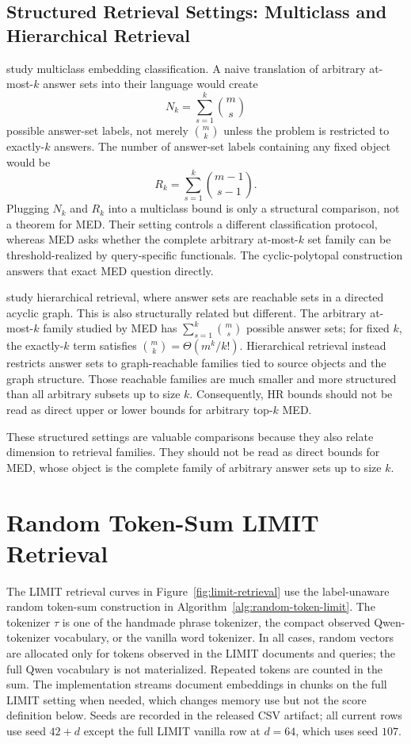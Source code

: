 \documentclass{article}
\begin{document}
\subsection{Structured Retrieval Settings: Multiclass and Hierarchical Retrieval}

\citet{guo2019breaking} study multiclass embedding classification. A naive translation of arbitrary at-most-$k$ answer sets into their language would create
\[
    N_k=\sum_{s=1}^{k}\binom{m}{s}
\]
possible answer-set labels, not merely $\binom{m}{k}$ unless the problem is restricted to exactly-$k$ answers. The number of answer-set labels containing any fixed object would be
\[
    R_k=\sum_{s=1}^{k}\binom{m-1}{s-1}.
\]
Plugging $N_k$ and $R_k$ into a multiclass bound is only a structural comparison, not a theorem for MED. Their setting controls a different classification protocol, whereas MED asks whether the complete arbitrary at-most-$k$ set family can be threshold-realized by query-specific functionals. The cyclic-polytopal construction answers that exact MED question directly.

\citet{you2025hierarchical} study hierarchical retrieval, where answer sets are reachable sets in a directed acyclic graph. This is also structurally related but different. The arbitrary at-most-$k$ family studied by MED has $\sum_{s=1}^{k}\binom{m}{s}$ possible answer sets; for fixed $k$, the exactly-$k$ term satisfies $\binom{m}{k}=\Theta(m^k/k!)$. Hierarchical retrieval instead restricts answer sets to graph-reachable families tied to source objects and the graph structure. Those reachable families are much smaller and more structured than all arbitrary subsets up to size $k$. Consequently, HR bounds should not be read as direct upper or lower bounds for arbitrary top-$k$ MED.

These structured settings are valuable comparisons because they also relate dimension to retrieval families. They should not be read as direct bounds for MED, whose object is the complete family of arbitrary answer sets up to size $k$.
\section{Random Token-Sum LIMIT Retrieval}\label{app:random-token-limit}

The LIMIT retrieval curves in Figure~\ref{fig:limit-retrieval} use the
label-unaware random token-sum construction in
Algorithm~\ref{alg:random-token-limit}. The tokenizer $\tau$ is one of
the handmade phrase tokenizer, the compact observed Qwen-tokenizer
vocabulary, or the vanilla word tokenizer. In all cases, random vectors
are allocated only for tokens observed in the LIMIT documents and
queries; the full Qwen vocabulary is not materialized. Repeated tokens
are counted in the sum. The implementation streams document embeddings
in chunks on the full LIMIT setting when needed, which changes memory
use but not the score definition below. Seeds are recorded in the
released CSV artifact; all current rows use seed $42+d$ except the full
LIMIT vanilla row at $d=64$, which uses seed $107$.
\end{document}
